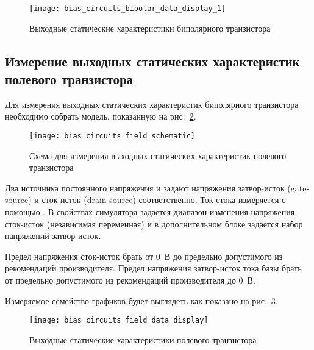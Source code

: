 \begin{figure}[!ht]
    \centering
    \texttt{[image: bias\_circuits\_bipolar\_data\_display\_1]}
    \caption{Выходные статические характеристики биполярного транзистора}%
    \label{fig:bias_circuits_bipolar_data_display_1}
\end{figure}

\subsection{Измерение выходных статических характеристик полевого транзистора}

Для измерения выходных статических характеристик биполярного транзистора необходимо собрать модель, показанную на рис.~\ref{fig:bias_circuits_field_schematic}.

\begin{figure}[!ht]
    \centering
    \texttt{[image: bias\_circuits\_field\_schematic]}
    \caption{Схема для измерения выходных статических характеристик полевого транзистора}%
    \label{fig:bias_circuits_field_schematic}
\end{figure}

Два источника постоянного напряжения  и  задают напряжения затвор-исток (gate-source) и сток-исток (drain-source) соответственно.
Ток стока измеряется с помощью . В свойствах симулятора  задается диапазон изменения напряжения сток-исток (независимая переменная) и в дополнительном блоке  задается набор напряжений затвор-исток.

Предел напряжения сток-исток брать от 0~В до предельно допустимого из рекомендаций производителя. Предел напряжения затвор-исток тока базы брать от предельно допустимого из рекомендаций производителя до 0~В.

Измеряемое семейство графиков будет выглядеть как показано на рис.~\ref{fig:bias_circuits_field_data_display}.

\begin{figure}[!ht]
    \centering
    \texttt{[image: bias\_circuits\_field\_data\_display]}
    \caption{Выходные статические характеристики полевого транзистора}%
    \label{fig:bias_circuits_field_data_display}
\end{figure}
